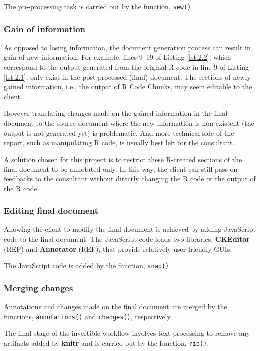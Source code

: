 \documentclass[a4paper, 12pt]{report}
\begin{document}
The pre-processing task is carried out by the function, \texttt{sew()}.

\subsubsection*{Gain of information}
As opposed to losing information, the document generation process can result in gain of new information. For example, lines 9--19 of Listing \ref{lst:2.2}, which correspond to the output generated from the original R code in line 9 of Listing \ref{lst:2.1}, only exist in the post-processed (final) document. The sections of newly gained information, i.e., the output of R Code Chunks, may seem editable to the client.

However translating changes made on the gained information in the final document to the source document where the new information is non-existent (the output is not generated yet) is problematic. And more technical side of the report, such as manipulating R code, is usually best left for the consultant.

A solution chosen for this project is to restrict these R-created sections of the final document to be annotated only. In this way, the client can still pass on feedbacks to the consultant without directly changing the R code or the output of the R code.

\subsubsection*{Editing final document}
Allowing the client to modify the final document is achieved by adding JavaScript code to the final document. The JavaScript code loads two libraries, \textbf{CKEditor} (REF) and \textbf{Annotator} (REF), that provide relatively user-friendly GUIs.

The JavaScript code is added by the function, \texttt{snap()}.

\subsubsection*{Merging changes}
Annotations and changes made on the final document are merged by the functions, \texttt{annotations()} and \texttt{changes()}, respectively.

The final stage of the invertible workflow involves text processing to remove any artifacts added by \textbf{knitr} and is carried out by the function, \texttt{rip()}.
\end{document}
